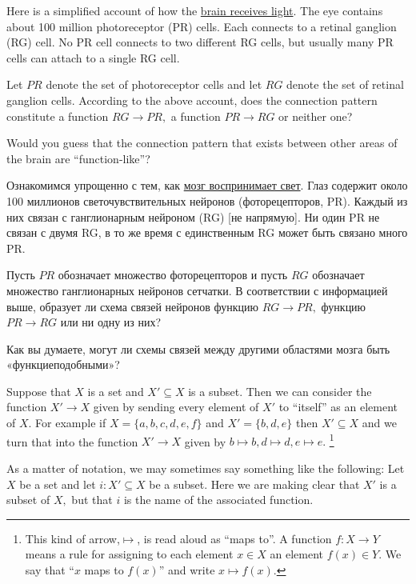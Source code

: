 \documentclass[../main/CT4S-EN-RU]{subfiles}
\begin{document}
\begin{exerciseENG}
Here is a simplified account of how the \href{http://en.wikipedia.org/wiki/Retina}{\text brain receives light}. The eye contains about 100 million photoreceptor (PR) cells. Each connects to a retinal ganglion (RG) cell. No PR cell connects to two different RG cells, but usually many PR cells can attach to a single RG cell. 

Let $PR$ denote the set of photoreceptor cells and let $RG$ denote the set of retinal ganglion cells. 
\sexc According to the above account, does the connection pattern constitute a function $RG{→} PR,$ a function $PR{→} RG$ or neither one? 
\item Would you guess that the connection pattern that exists between other areas of the brain are “function-like”?
\endsexc
\end{exerciseENG}

\begin{exerciseRUS}
Ознакомимся упрощенно с тем, как \href{https://ru.wikipedia.org/wiki/%D0%A1%D0%B5%D1%82%D1%87%D0%B0%D1%82%D0%BA%D0%B0}{\text мозг воспринимает свет}. Глаз содержит около 100 миллионов светочувствительных нейронов (фоторецепторов, PR). Каждый из них связан с ганглионарным нейроном (RG) [не напрямую]. Ни один PR не связан с двумя RG, в то же время с единственным RG может быть связано много PR.

Пусть $PR$ обозначает множество фоторецепторов и пусть $RG$ обозначает множество ганглионарных нейронов сетчатки. 
\sexc В соответствии с информацией выше, образует ли схема связей нейронов функцию $RG{→} PR,$ функцию $PR{→} RG$ или ни одну из них? 
\item Как вы думаете, могут ли схемы связей между другими областями мозга быть «функциеподобными»? 
\endsexc 
\end{exerciseRUS}

\begin{exampleENG}\label{ex:subset as function}
Suppose that $X$ is a set and $X'\subseteq X$ is a subset. Then we can consider the function $X'{→} X$ given by sending every element of $X'$ to “itself” as an element of $X.$ For example if $X=\{a,b,c,d,e,f\}$ and $X'=\{b,d,e\}$ then $X'\subseteq X$ and we turn that into the function $X'{→} X$ given by $b\mapsto b, d\mapsto d, e\mapsto e.$%
\footnote{This kind of arrow,\;\;$\mapsto$\;\;, is read aloud as “maps to”. A function $f\colon X{→} Y$ means a rule for assigning to each element $x\in X$ an element $f(x)\in Y.$ We say that “$x$ maps to $f(x)$” and write $x\mapsto f(x).$}

As a matter of notation, we may sometimes say something like the following: Let $X$ be a set and let $i\colon X'\subseteq X$ be a subset. Here we are making clear that $X'$ is a subset of $X,$ but that $i$ is the name of the associated function.
\end{exampleENG}
\end{document}
